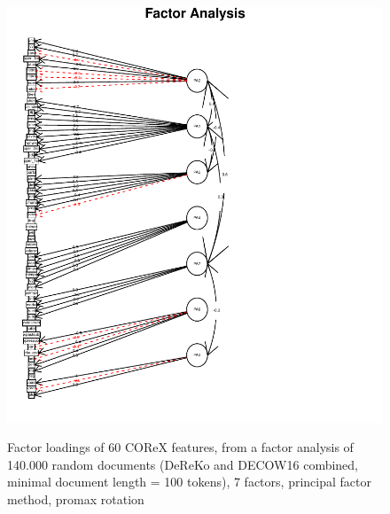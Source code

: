 \begin{figure}
   \includegraphics[scale=.9]{../R/FA-PA-7}
   \label{fa-pa-7-factors}
  \caption{Factor loadings of 60 COReX features, from a  factor analysis of 140.000 random documents (DeReKo and DECOW16 combined, minimal document length = 100 tokens), 7 factors, principal factor method, promax rotation}  
\end{figure}

